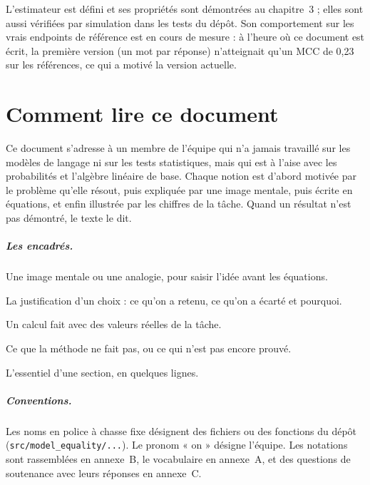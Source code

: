 \documentclass[11pt,a4paper]{report}
\theoremstyle{definition}
\theoremstyle{plain}
\newcommand{\code}[1]{\texttt{#1}}
\begin{document}
L'estimateur est défini et ses propriétés sont démontrées au chapitre~3 ; elles sont aussi vérifiées par simulation dans les tests du dépôt. Son comportement sur les vrais endpoints de référence est en cours de mesure : à l'heure où ce document est écrit, la première version (un mot par réponse) n'atteignait qu'un MCC de 0,23 sur les références, ce qui a motivé la version actuelle.

\chapter*{Comment lire ce document}

Ce document s'adresse à un membre de l'équipe qui n'a jamais travaillé sur les modèles de langage ni sur les tests statistiques, mais qui est à l'aise avec les probabilités et l'algèbre linéaire de base. Chaque notion est d'abord motivée par le problème qu'elle résout, puis expliquée par une image mentale, puis écrite en équations, et enfin illustrée par les chiffres de la tâche. Quand un résultat n'est pas démontré, le texte le dit.

\paragraph{Les encadrés.}

\begin{intuition}Une image mentale ou une analogie, pour saisir l'idée avant les équations.\end{intuition}
\begin{pourquoi}La justification d'un choix : ce qu'on a retenu, ce qu'on a écarté et pourquoi.\end{pourquoi}
\begin{exemple}Un calcul fait avec des valeurs réelles de la tâche.\end{exemple}
\begin{limite}Ce que la méthode ne fait pas, ou ce qui n'est pas encore prouvé.\end{limite}
\begin{retenir}L'essentiel d'une section, en quelques lignes.\end{retenir}

\paragraph{Conventions.} Les noms en police à chasse fixe désignent des fichiers ou des fonctions du dépôt (\code{src/model\_equality/...}). Le pronom « on » désigne l'équipe. Les notations sont rassemblées en annexe~B, le vocabulaire en annexe~A, et des questions de soutenance avec leurs réponses en annexe~C.
\end{document}
